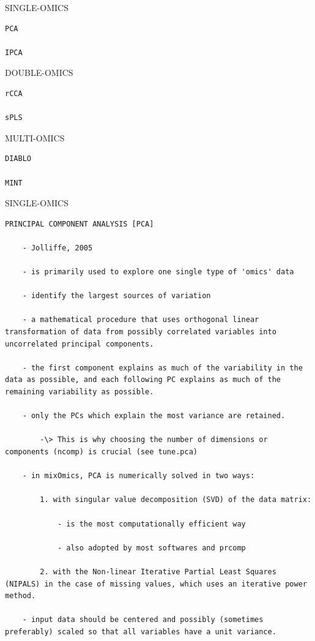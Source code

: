 \documentclass[
]{book}
\begin{document}
SINGLE-OMICS

\begin{verbatim}
PCA

IPCA
\end{verbatim}

DOUBLE-OMICS

\begin{verbatim}
rCCA

sPLS
\end{verbatim}

MULTI-OMICS

\begin{verbatim}
DIABLO

MINT
\end{verbatim}

SINGLE-OMICS

\begin{verbatim}
PRINCIPAL COMPONENT ANALYSIS [PCA]

    - Jolliffe, 2005

    - is primarily used to explore one single type of 'omics' data

    - identify the largest sources of variation

    - a mathematical procedure that uses orthogonal linear transformation of data from possibly correlated variables into uncorrelated principal components.

    - the first component explains as much of the variability in the data as possible, and each following PC explains as much of the remaining variability as possible.

    - only the PCs which explain the most variance are retained.

        -\> This is why choosing the number of dimensions or components (ncomp) is crucial (see tune.pca)

    - in mixOmics, PCA is numerically solved in two ways:

        1. with singular value decomposition (SVD) of the data matrix:

            - is the most computationally efficient way

            - also adopted by most softwares and prcomp

        2. with the Non-linear Iterative Partial Least Squares (NIPALS) in the case of missing values, which uses an iterative power method.

    - input data should be centered and possibly (sometimes preferably) scaled so that all variables have a unit variance.


\end{verbatim}
\end{document}
